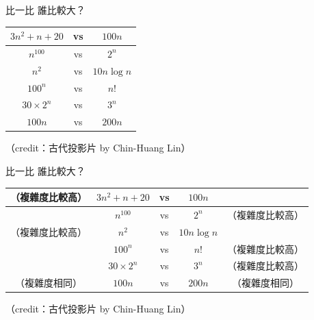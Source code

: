 \documentclass[aspectratio=169]{beamer}
\begin{document}
\begin{frame}{比一比}
  誰比較大？

  \begin{center}
    \bgroup
      \def\arraystretch{1.3}
      \setlength\tabcolsep{1em}
      \begin{tabular}[h]{c c c}
        \hline
        $3n^2 + n + 20$ & vs & $100n$ \\ \hline
        $n ^ {100}$ & vs & $2 ^ n$ \\ \hline
        $n ^ 2$ & vs & $10 n \log n$ \\ \hline
        $100^n$ & vs & $n!$ \\ \hline
        $30 \times 2 ^ n$ & vs & $3 ^ n$ \\ \hline
        $100n$ & vs & $200n$ \\ \hline
      \end{tabular}
    \egroup
  \end{center}

  （credit：古代投影片 by Chin-Huang Lin）
\end{frame}

\begin{frame}{比一比}
  誰比較大？

  \begin{center}
    \bgroup
      \def\arraystretch{1.3}
      \setlength\tabcolsep{1em}
      \begin{tabular}[h]{c c c c c}
        \hline
        （複雜度比較高） & $3n^2 + n + 20$ & vs & $100n$ \\ \hline
        & $n ^ {100}$ & vs & $2 ^ n$ & （複雜度比較高） \\ \hline
        （複雜度比較高） & $n ^ 2$ & vs & $10 n \log n$ & \\ \hline
        & $100^n$ & vs & $n!$ & （複雜度比較高） \\ \hline
        & $30 \times 2 ^ n$ & vs & $3 ^ n$ & （複雜度比較高） \\ \hline
        （複雜度相同） & $100n$ & vs & $200n$ & （複雜度相同） \\ \hline
      \end{tabular}
    \egroup
  \end{center}

  （credit：古代投影片 by Chin-Huang Lin）
\end{frame}
\end{document}
